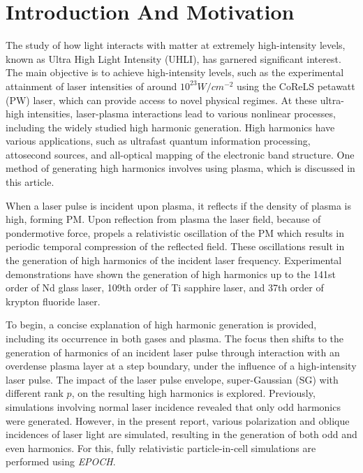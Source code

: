 \section{Introduction And Motivation}
The study of how light interacts with matter at extremely high-intensity levels, known as Ultra High Light Intensity (UHLI), has garnered significant interest.  The main objective is to achieve high-intensity levels, such as the experimental attainment of laser intensities of around $10^{23} W/cm^{-2}$ using the CoReLS petawatt (PW) laser\cite{highintensity}, which can provide access to novel physical regimes. At these ultra-high intensities, laser-plasma interactions lead to various nonlinear processes, including the widely studied high harmonic generation\cite{henri}. High harmonics have various applications, such as ultrafast quantum information processing, attosecond sources, and all-optical mapping of the electronic band structure. One method of generating high harmonics involves using plasma, which is discussed in this article.

When a laser pulse is incident upon plasma, it reflects if the density of plasma is high, forming PM. Upon reflection from plasma the laser field, because of pondermotive force, propels a relativistic oscillation of the PM which results in periodic temporal compression of the reflected field. These oscillations result in the generation of high harmonics of the incident laser frequency.\cite{lichters} Experimental demonstrations have shown the generation of high harmonics up to the 141st order of Nd glass laser\cite{hormonics1}, 109th order of Ti sapphire laser\cite{hormonics2}, and 37th order of krypton fluoride laser\cite{hormonics3}.

To begin, a concise explanation of high harmonic generation is provided, including its occurrence in both gases\cite{gas-main}\cite{gas-second}\cite{hhg-book} and plasma\cite{hhg-relativistic}\cite{hhg-main}\cite{hhg-second}\cite{history-similarity}\cite{universal-spectra}. The focus then shifts to the generation of harmonics of an incident laser pulse through interaction with an overdense plasma layer at a step boundary, under the influence of a high-intensity laser pulse. The impact of the laser pulse envelope, super-Gaussian (SG) with different rank $p$, on the resulting high harmonics is explored. Previously, simulations involving normal laser incidence revealed that only odd harmonics were generated. However, in the present report, various polarization and oblique incidences of laser light are simulated, resulting in the generation of both odd and even harmonics. For this, fully relativistic particle-in-cell simulations are performed using \textit{EPOCH}\cite{EPOCH}.